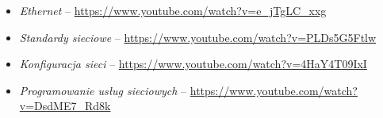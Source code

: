 % 
% 
% 
% 

\begin{itemize}
\item \emph{Ethernet} – \url{https://www.youtube.com/watch?v=e_jTgLC_xxg}
\item \emph{Standardy sieciowe} – \url{https://www.youtube.com/watch?v=PLDs5G5Ftlw}
\item \emph{Konfiguracja sieci} – \url{https://www.youtube.com/watch?v=4HaY4T09IxI}
\item \emph{Programowanie usług sieciowych} – \url{https://www.youtube.com/watch?v=DsdME7_Rd8k}
\end{itemize}
